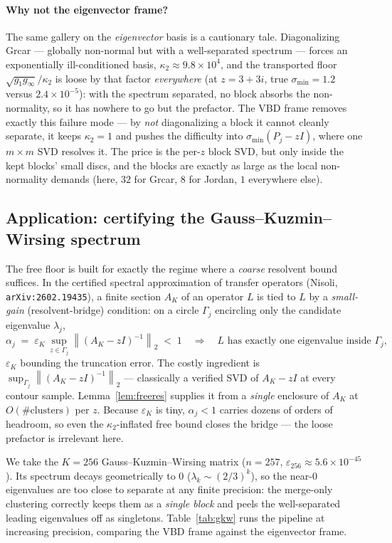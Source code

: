 \documentclass[11pt,a4paper]{article}
\newcommand{\norm}[1]{\left\|#1\right\|}
\theoremstyle{plain}
\theoremstyle{definition}
\begin{document}
\paragraph{Why not the eigenvector frame?} The same gallery on the \emph{eigenvector} basis
is a cautionary tale. Diagonalizing Grcar --- globally non-normal but with a well-separated
spectrum --- forces an exponentially ill-conditioned basis, $\kappa_2\approx9.8\times10^{4}$,
and the transported floor $\sqrt{g_1g_\infty}/\kappa_2$ is loose by that factor
\emph{everywhere} (at $z=3+3i$, true $\sigma_{\min}=1.2$ versus $2.4\times10^{-5}$): with the
spectrum separated, no block absorbs the non-normality, so it has nowhere to go but the
prefactor. The VBD frame removes exactly this failure mode --- by \emph{not} diagonalizing a
block it cannot cleanly separate, it keeps $\kappa_2=1$ and pushes the difficulty into
$\sigma_{\min}(P_j-zI)$, where one $m\times m$ SVD resolves it. The price is the per-$z$
block SVD, but only inside the kept blocks' small discs, and the blocks are exactly as large
as the local non-normality demands (here, $32$ for Grcar, $8$ for Jordan, $1$ everywhere
else).

\subsection*{Application: certifying the Gauss--Kuzmin--Wirsing spectrum}\label{sec:gkw}

The free floor is built for exactly the regime where a \emph{coarse} resolvent bound
suffices. In the certified spectral approximation of transfer operators
(Nisoli, \texttt{arXiv:2602.19435}), a finite section $A_K$ of an operator $L$ is tied to
$L$ by a \emph{small-gain} (resolvent-bridge) condition: on a circle $\Gamma_j$ encircling
only the candidate eigenvalue $\lambda_j$,
\[
  \alpha_j \;=\; \varepsilon_K\,\sup_{z\in\Gamma_j}\norm{(A_K-zI)^{-1}}_2 \;<\; 1
  \quad\Longrightarrow\quad L \text{ has exactly one eigenvalue inside } \Gamma_j,
\]
$\varepsilon_K$ bounding the truncation error. The costly ingredient is
$\sup_{\Gamma_j}\norm{(A_K-zI)^{-1}}_2$ --- classically a verified SVD of $A_K-zI$ at every
contour sample. Lemma~\ref{lem:freeres} supplies it from a \emph{single} enclosure of
$A_K$ at $O(\#\text{clusters})$ per $z$. Because $\varepsilon_K$ is tiny, $\alpha_j<1$
carries dozens of orders of headroom, so even the $\kappa_2$-inflated free bound closes
the bridge --- the loose prefactor is irrelevant here.

We take the $K=256$ Gauss--Kuzmin--Wirsing matrix ($n=257$, $\varepsilon_{256}\approx
5.6\times10^{-45}$). Its spectrum decays geometrically to $0$ ($\lambda_k\sim(2/3)^k$), so
the near-$0$ eigenvalues are too close to separate at any finite precision: the merge-only
clustering correctly keeps them as a \emph{single block} and peels the well-separated
leading eigenvalues off as singletons. Table~\ref{tab:gkw} runs the pipeline at increasing
precision, comparing the VBD frame against the eigenvector frame.
\end{document}
